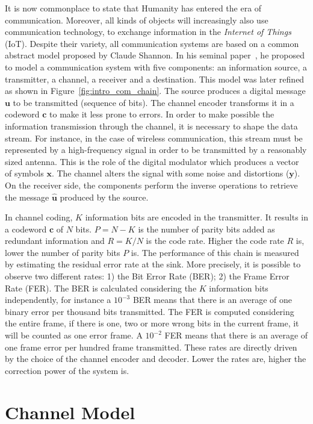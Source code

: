 It is now commonplace to state that Humanity has entered the era of
communication. Moreover, all kinds of objects will increasingly also use
communication technology, to exchange information in the \emph{Internet of
Things} (IoT). Despite their variety, all communication systems are based on a
common abstract model proposed by Claude Shannon. In his seminal
paper~\cite{Shannon1948}, he proposed to model a communication system with five
components: an information source, a transmitter, a channel, a receiver and a
destination. This model was later refined as shown in
Figure~\ref{fig:intro_com_chain}. The source produces a digital message $\bm{u}$
to be transmitted (sequence of bits). The channel encoder transforms it in a
codeword $\bm{c}$ to make it less prone to errors. In order to make possible the
information transmission through the channel, it is necessary to shape the data
stream. For instance, in the case of wireless communication, this stream must be
represented by a high-frequency signal in order to be transmitted by a
reasonably sized antenna. This is the role of the digital modulator which
produces a vector of symbols $\bm{x}$. The channel alters the signal with some
noise and distortions ($\bm{y}$). On the receiver side, the components perform
the inverse operations to retrieve the message $\bm{\hat{u}}$ produced by the
source.

In channel coding, $K$ information bits are encoded in the transmitter. It
results in a codeword $\bm{c}$ of $N$ bits. $P = N - K$ is the number of parity
bits added as redundant information and $R = K/N$ is the code rate. Higher the
code rate $R$ is, lower the number of parity bits $P$ is. The performance of
this chain is measured by estimating the residual error rate at the sink. More
precisely, it is possible to observe two different rates: 1) the Bit Error Rate
(BER); 2) the Frame Error Rate (FER). The BER is calculated considering the $K$
information bits independently, for instance a $10^{-3}$ BER means that there is
an average of one binary error per thousand bits transmitted. The FER is
computed considering the entire frame, if there is one, two or more wrong bits
in the current frame, it will be counted as one error frame. A $10^{-2}$ FER
means that there is an average of one frame error per hundred frame transmitted.
These rates are directly driven by the choice of the channel encoder and
decoder. Lower the rates are, higher the correction power of the system is.

\section{Channel Model}

